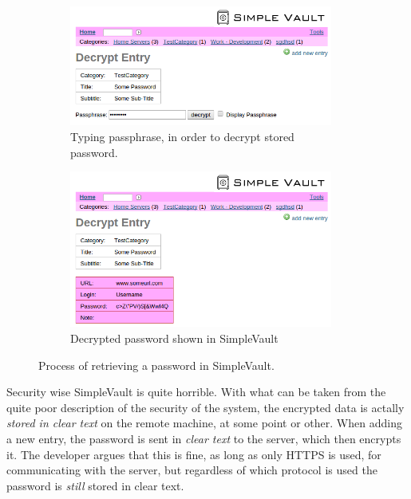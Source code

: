 			\begin{figure}[htbp]
				\centering
				\begin{subfigure}{\textwidth}
					\centering
					\includegraphics[width=0.95\textwidth]{figures/analysis/simplevault_getpassword.png}
					\caption{Typing passphrase, in order to decrypt stored password.}
					\label{fig:simplevault_getpassword_type}
				\end{subfigure}%
				
				\begin{subfigure}{\textwidth}
					\centering
					\includegraphics[width=0.95\textwidth]{figures/analysis/simplevault_getpassword_decrypted.png}
					\caption{Decrypted password shown in SimpleVault}
					\label{fig:simplevault_getpassword_decrypted}
				\end{subfigure}
				
				\caption{Process of retrieving a password in SimpleVault.}
				\label{fig:simplevault_getpassword}
			\end{figure}


			Security wise SimpleVault is quite horrible. With what can be taken from the quite poor description of the security of the system, the encrypted data is actally \emph{stored in clear text} on the remote machine, at some point or other. When adding a new entry, the password is sent in \emph{clear text} to the server, which then encrypts it. The developer argues that this is fine, as long as only HTTPS is used, for communicating with the server, but regardless of which protocol is used the password is \emph{still} stored in clear text.

